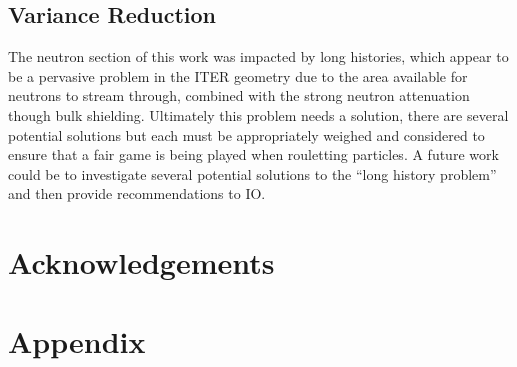 \documentclass[12pt]{article}
\begin{document}
\subsection*{Variance Reduction}
The neutron section of this work was impacted by long histories, which appear to
be a pervasive problem in the ITER geometry due to the area available for
neutrons to stream through, combined with the strong neutron attenuation though
bulk shielding. Ultimately this problem needs a solution, there are several
potential solutions but each must be appropriately weighed and considered to
ensure that a fair game is being played when rouletting particles. A future
work could be to investigate several potential solutions to the ``long history
problem'' and then provide recommendations to IO.
\section{Acknowledgements}
\newpage
\clearpage


\newpage
\clearpage
\section{Appendix}

\end{document}
